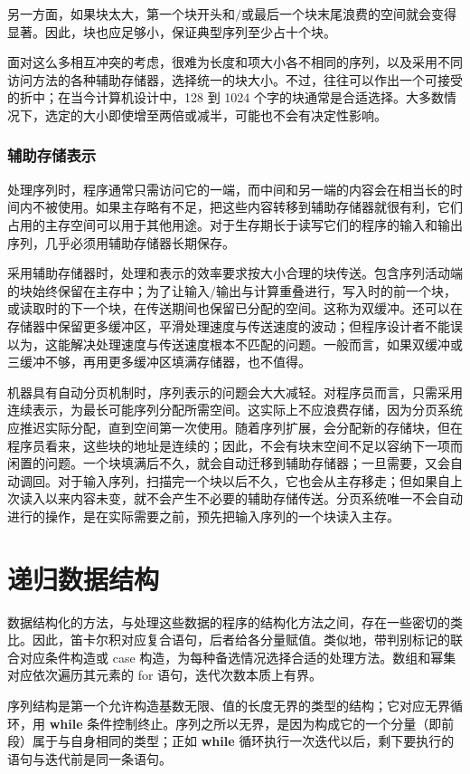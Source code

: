 另一方面，如果块太大，第一个块开头和$/$或最后一个块末尾浪费的空间就会变得显著。因此，块也应足够小，保证典型序列至少占十个块。

面对这么多相互冲突的考虑，很难为长度和项大小各不相同的序列，以及采用不同访问方法的各种辅助存储器，选择统一的块大小。不过，往往可以作出一个可接受的折中；在当今计算机设计中，128 到 1024 个字的块通常是合适选择。大多数情况下，选定的大小即使增至两倍或减半，可能也不会有决定性影响。

\subsubsection{辅助存储表示}

处理序列时，程序通常只需访问它的一端，而中间和另一端的内容会在相当长的时间内不被使用。如果主存略有不足，把这些内容转移到辅助存储器就很有利，它们占用的主存空间可以用于其他用途。对于生存期长于读写它们的程序的输入和输出序列，几乎必须用辅助存储器长期保存。

采用辅助存储器时，处理和表示的效率要求按大小合理的块传送。包含序列活动端的块始终保留在主存中；为了让输入$/$输出与计算重叠进行，写入时的前一个块，或读取时的下一个块，在传送期间也保留已分配的空间。这称为双缓冲。还可以在存储器中保留更多缓冲区，平滑处理速度与传送速度的波动；但程序设计者不能误以为，这能解决处理速度与传送速度根本不匹配的问题。一般而言，如果双缓冲或三缓冲不够，再用更多缓冲区填满存储器，也不值得。

机器具有自动分页机制时，序列表示的问题会大大减轻。对程序员而言，只需采用连续表示，为最长可能序列分配所需空间。这实际上不应浪费存储，因为分页系统应推迟实际分配，直到空间第一次使用。随着序列扩展，会分配新的存储块，但在程序员看来，这些块的地址是连续的；因此，不会有块末空间不足以容纳下一项而闲置的问题。一个块填满后不久，就会自动迁移到辅助存储器；一旦需要，又会自动调回。对于输入序列，扫描完一个块以后不久，它也会从主存移走；但如果自上次读入以来内容未变，就不会产生不必要的辅助存储传送。分页系统唯一不会自动进行的操作，是在实际需要之前，预先把输入序列的一个块读入主存。
\section[递归数据结构]{递归数据结构}

数据结构化的方法，与处理这些数据的程序的结构化方法之间，存在一些密切的类比。因此，笛卡尔积对应复合语句，后者给各分量赋值。类似地，带判别标记的联合对应条件构造或 case 构造，为每种备选情况选择合适的处理方法。数组和幂集对应依次遍历其元素的 for 语句，迭代次数本质上有界。

序列结构是第一个允许构造基数无限、值的长度无界的类型的结构；它对应无界循环，用 \textbf{while} 条件控制终止。序列之所以无界，是因为构成它的一个分量（即前段）属于与自身相同的类型；正如 \textbf{while} 循环执行一次迭代以后，剩下要执行的语句与迭代前是同一条语句。

